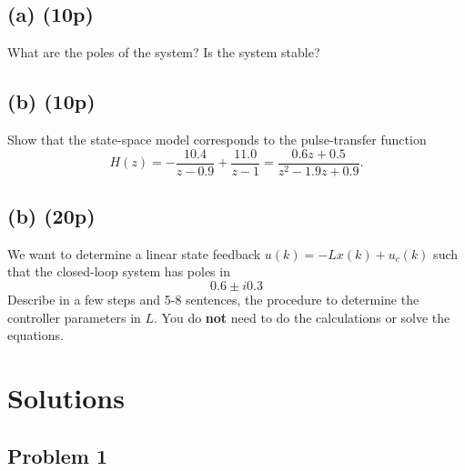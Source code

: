 \documentclass{scrartcl}
\begin{document}
\subsection*{(a) (10p)}
\label{sec:orgheadline7}
What are the poles of the system? Is the system stable?

\subsection*{(b) (10p)}
\label{sec:orgheadline8}
Show that the state-space model corresponds to the pulse-transfer function
\[ H(z) = -\frac{10.4}{z-0.9} + \frac{11.0}{z-1} = \frac{0.6z + 0.5}{z^2 - 1.9z + 0.9}. \]
\subsection*{(b) (20p)}
\label{sec:orgheadline9}
We want to determine a linear state feedback \(u(k) = -Lx(k) + u_c(k)\) such that the closed-loop system has poles in \[ 0.6 \pm i0.3 \] Describe in a few steps and 5-8 sentences, the procedure to determine the controller parameters in \(L\). You do \textbf{not} need to do the calculations or solve the equations. 

\section*{Solutions}
\label{sec:orgheadline21}
\subsection*{Problem 1}
\label{sec:orgheadline13}
\end{document}
